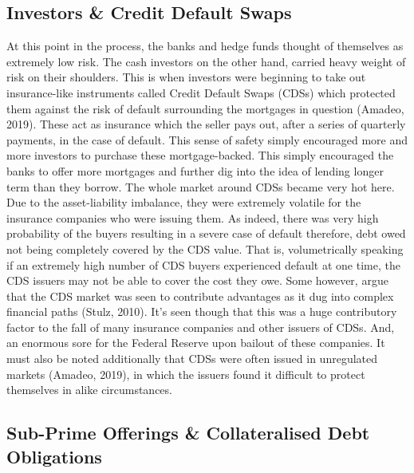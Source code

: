 \documentclass[11pt, english]{article}
\begin{document}
	\subsection{Investors \& Credit Default Swaps}

	At this point in the process, the banks and hedge funds thought of themselves as extremely low risk. The cash investors on the other hand, carried heavy weight of risk on their shoulders. This is when investors were beginning to take out insurance-like instruments called Credit Default Swaps (CDSs) which protected them against the risk of default surrounding the mortgages in question (Amadeo, 2019). These act as insurance which the seller pays out, after a series of quarterly payments, in the case of default. This sense of safety simply encouraged more and more investors to purchase these mortgage-backed. This simply encouraged the banks to offer more mortgages and further dig into the idea of lending longer term than they borrow. The whole market around CDSs became very hot here. Due to the asset-liability imbalance, they were extremely volatile for the insurance companies who were issuing them. As indeed, there was very high probability of the buyers resulting in a severe case of default therefore, debt owed not being completely covered by the CDS value. That is, volumetrically speaking if an extremely high number of CDS buyers experienced default at one time, the CDS issuers may not be able to cover the cost they owe. Some however, argue that the CDS market was seen to contribute advantages as it dug into complex financial paths (Stulz, 2010). It's seen though that this was a huge contributory factor to the fall of many insurance companies and other issuers of CDSs. And, an enormous sore for the Federal Reserve upon bailout of these companies. It must also be noted additionally that CDSs were often issued in unregulated markets (Amadeo, 2019), in which the issuers found it difficult to protect themselves in alike circumstances.

	\subsection{Sub-Prime Offerings \& Collateralised Debt Obligations}
\end{document}
